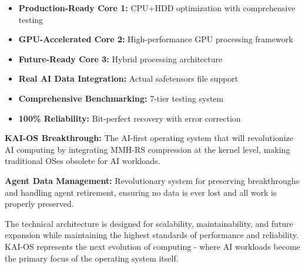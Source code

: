 \documentclass[12pt,a4paper]{article}
\begin{document}
\begin{itemize}
    \item \textbf{Production-Ready Core 1:} CPU+HDD optimization with comprehensive testing
    \item \textbf{GPU-Accelerated Core 2:} High-performance GPU processing framework
    \item \textbf{Future-Ready Core 3:} Hybrid processing architecture
    \item \textbf{Real AI Data Integration:} Actual safetensors file support
    \item \textbf{Comprehensive Benchmarking:} 7-tier testing system
    \item \textbf{100\% Reliability:} Bit-perfect recovery with error correction
\end{itemize}

\textbf{KAI-OS Breakthrough:} The AI-first operating system that will revolutionize AI computing by integrating MMH-RS compression at the kernel level, making traditional OSes obsolete for AI workloads.

\textbf{Agent Data Management:} Revolutionary system for preserving breakthroughs and handling agent retirement, ensuring no data is ever lost and all work is properly preserved.

The technical architecture is designed for scalability, maintainability, and future expansion while maintaining the highest standards of performance and reliability. KAI-OS represents the next evolution of computing - where AI workloads become the primary focus of the operating system itself.
\end{document}
